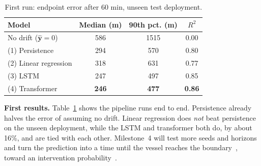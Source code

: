 \documentclass[sigconf]{acmart}
\begin{document}
\begin{table}[t]
\caption{First run: endpoint error after 60 min, unseen test deployment.}
\label{tab:results}
\footnotesize
\begin{tabular}{@{}lccc@{}}
\toprule
Model & Median (m) & 90th pct. (m) & $R^2$ \\
\midrule
No drift ($\hat{\mathbf{y}}=0$) & 586 & 1515 & 0.00 \\
(1) Persistence & 294 & 570 & 0.80 \\
(2) Linear regression & 318 & 631 & 0.77 \\
(3) LSTM & 247 & 497 & 0.85 \\
(4) Transformer & \textbf{246} & \textbf{477} & \textbf{0.86} \\
\bottomrule
\end{tabular}
\end{table}

\textbf{First results.} Table~\ref{tab:results} shows the pipeline runs end to end. Persistence already halves the error of assuming no drift. Linear regression does \emph{not} beat persistence on the unseen deployment, while the LSTM and transformer both do, by about 16\%, and are tied with each other. Milestone~4 will test more seeds and horizons and turn the prediction into a time until the vessel reaches the boundary~\cite{dugan2024drifting}, toward an intervention probability~\cite{kristensen2022dynamic}.



\end{document}
